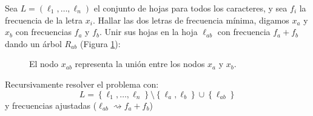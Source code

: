 \documentclass[english, spanish, fleqn, 10pt]{article}
\numberwithin{equation}{section}
\newcommand{\nparentesis}[1]{\left( #1 \right)}
\newcommand{\llaves}[1]{\left \{ #1 \right \}}
\theoremstyle{definition}
\begin{document}
Sea $L=\nparentesis{\ell_1, \ldots, \ell_n}$ el conjunto de hojas para todos los caracteres, y sea $f_i$ la frecuencia de la letra $x_i$. Hallar las dos letras de frecuencia mínima, digamos $x_a$ y $x_b$ con frecuencias $f_a$ y $f_b$. Unir sus hojas en la hoja $\ell_{ab}$ con frecuencia $f_a+f_b$ dando un árbol $R_{ab}$ (Figura \ref{09::RabTree}):
\begin{figure}[!h]
	\centering
	\caption{El nodo $x_{ab}$ representa la unión entre los nodos $x_a$ y $x_b$.}
	\label{09::RabTree}
\end{figure}

Recursivamente resolver el problema con:
\begin{equation}
L=\llaves{\ell _1, \ldots, \ell _n}\setminus\llaves{\ell _a, \ell _b}\cup \llaves{\ell _{ab}}
\end{equation}
y frecuencias ajustadas ($\ell_{ab}\rightsquigarrow f_a+f_b$)
\end{document}
